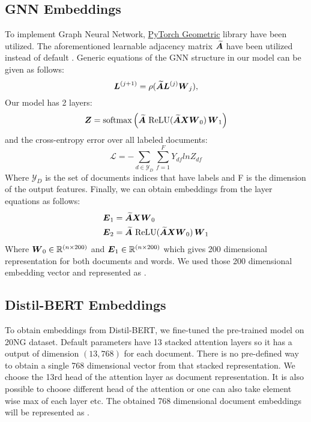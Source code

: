 \subsection{GNN Embeddings}
To implement Graph Neural Network, \href{https://pytorch-geometric.readthedocs.io/en/latest/}{PyTorch Geometric} library have been utilized. The aforementioned learnable adjacency matrix $\boldsymbol{\widetilde{A}}$ have been utilized instead of default . Generic equations of the GNN structure in our model can be given as follows:
    \begin{equation}
        \boldsymbol{L}^{(j+1)} = \rho (\boldsymbol{\widetilde{A}}\boldsymbol{L}^{(j)}\boldsymbol{W}_j),
        \label{eq2}
    \end{equation}
Our model has 2 layers:
    \begin{equation}
        \boldsymbol{Z} = \operatorname{softmax}\left(\boldsymbol{\widetilde{A}}\,\operatorname{ReLU}(\boldsymbol{\widetilde{A}}\boldsymbol{X}\boldsymbol{W}_0)\,\boldsymbol{W}_1\right)
    \end{equation}
    and the cross-entropy error over all labeled documents:
    \begin{equation}
        \mathcal{L} = -\sum_{d \in \mathcal{Y}_D}^{} \sum_{f= 1}^{F} Y_{df}ln Z_{df}
    \end{equation}
Where {\small{}$\mathcal{Y}_D$} is the set of documents indices that have labels and F is the dimension of the output features.
Finally, we can obtain embeddings from the layer equations as follows:
\begin{align}
    \boldsymbol{E}_1 & = \boldsymbol{\widetilde{A}}\boldsymbol{X}\boldsymbol{W}_0 \\
    \boldsymbol{E}_2 & = \boldsymbol{\widetilde{A}}\,\operatorname{ReLU}(\boldsymbol{\widetilde{A}}\boldsymbol{X}\boldsymbol{W}_0)\,\boldsymbol{W}_1
\end{align}
Where $\boldsymbol{W}_0 \in \mathbb{R}^{(n \times 200)}$ and $\boldsymbol{E}_1 \in \mathbb{R}^{(n\times200)}$ which gives 200 dimensional representation for both documents and words. We used those 200 dimensional embedding vector and represented as \GNNEM. 

\subsection{Distil-BERT Embeddings}
To obtain embeddings from Distil-BERT, we fine-tuned the pre-trained model on 20NG dataset. Default parameters have 13 stacked attention layers so it has a output of dimension $(13,768)$ for each document. There is no pre-defined way to obtain a single 768 dimensional vector from that stacked representation. We choose the 13rd head of the attention layer as document representation. It is also possible to choose different head of the attention or one can also take element wise max of each layer etc. The obtained 768 dimensional document embeddings will be represented as \BERTEM. 

